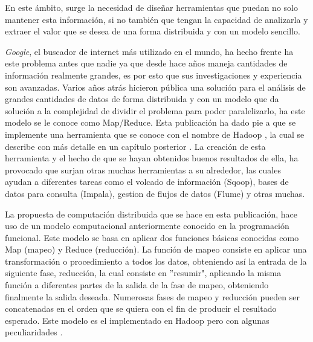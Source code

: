 En este \'ambito, surge la necesidad de dise\~nar herramientas que puedan no solo mantener esta informaci\'on, si no también que tengan la capacidad de analizarla y extraer el valor que se desea de una forma distribuida y con un modelo sencillo. 

\textit{Google}, el buscador de internet m\'as utilizado en el mundo, ha hecho frente ha este problema antes que nadie ya que desde hace a\~nos maneja cantidades de información realmente grandes, es por esto que sus investigaciones y experiencia son avanzadas. Varios a\~nos atrás hicieron p\'ublica \cite{paper-mapreduce} una solución para el an\'alisis de grandes cantidades de datos de forma distribuida y con un modelo que da soluci\'on a la complejidad de dividir el problema para poder paralelizarlo, ha este modelo se le conoce como Map/Reduce. Esta publicación ha dado pie a que se implemente una herramienta que se conoce con el nombre de Hadoop \cite{hadoop}, la cual se describe con m\'as detalle en un cap\'itulo posterior . La creaci\'on de esta herramienta y el hecho de que se hayan obtenidos buenos resultados de ella, ha provocado que surjan otras muchas herramientas a su alrededor, las cuales ayudan a diferentes tareas como el volcado de información (Sqoop), bases de datos para consulta (Impala), gestion de flujos de datos (Flume) y otras muchas.

La propuesta de computación distribuida que se hace en esta publicación, hace uso de un modelo computacional anteriormente conocido en la programación funcional. Este modelo se basa en aplicar dos funciones básicas conocidas como Map (mapeo) y Reduce (reducci\'on). La función de mapeo consiste en aplicar una transformación o procedimiento a todos los datos, obteniendo así la entrada de la siguiente fase, reducción, la cual consiste en ''resumir", aplicando la misma función a diferentes partes de la salida de la fase de mapeo, obteniendo finalmente la salida deseada. Numerosas fases de mapeo y reducción pueden ser concatenadas en el orden que se quiera con el fin de producir el resultado esperado. Este modelo es el implementado en Hadoop pero con algunas peculiaridades .
